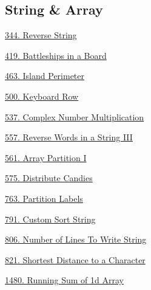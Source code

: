 \subsection*{String \& Array}
\begin{flushleft}
    \hyperref[algo:344]{344. Reverse String}

    \hyperref[algo:419]{419. Battleships in a Board}
    
    \hyperref[algo:463]{463. Island Perimeter}

    \hyperref[algo:500]{500. Keyboard Row}

    \hyperref[algo:537]{537. Complex Number Multiplication}

    \hyperref[algo:557]{557. Reverse Words in a String III}

    \hyperref[algo:561]{561. Array Partition I}

    \hyperref[algo:575]{575. Distribute Candies}

    \hyperref[algo:763]{763. Partition Labels}

    \hyperref[algo:791]{791. Custom Sort String}

    \hyperref[algo:806]{806. Number of Lines To Write String}

    \hyperref[algo:821]{821. Shortest Distance to a Character}

    \hyperref[algo:1480]{1480. Running Sum of 1d Array}
\end{flushleft}
